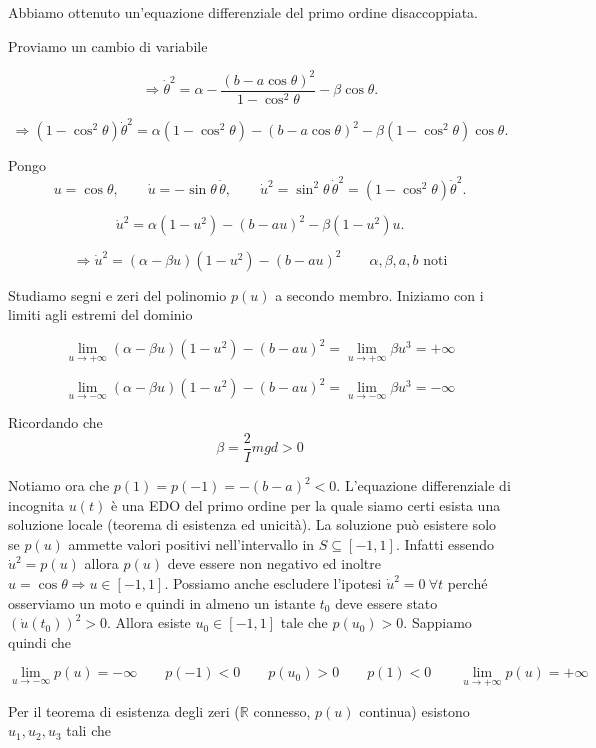 Abbiamo ottenuto un'equazione differenziale del primo ordine disaccoppiata.

Proviamo un cambio di variabile

\[
\Rightarrow
\dot{\theta}^2
=
\alpha
-
\frac{\left(b-a\cos\theta\right)^2}{1-\cos^2\theta}
-
\beta\cos\theta.
\]

\[
\Rightarrow
\left(1-\cos^2\theta\right)\dot{\theta}^2
=
\alpha\left(1-\cos^2\theta\right)
-
\left(b-a\cos\theta\right)^2
-
\beta\left(1-\cos^2\theta\right)\cos\theta.
\]

Pongo
\[
u=\cos\theta,
\qquad
\dot{u}=-\sin\theta\,\dot{\theta},
\qquad
\dot{u}^2
=
\sin^2\theta\,\dot{\theta}^2
=
\left(1-\cos^2\theta\right)\dot{\theta}^2.
\]

\[
\dot{u}^2
=
\alpha\left(1-u^2\right)
-
\left(b-au\right)^2
-
\beta\left(1-u^2\right)u.
\]

\[
\Rightarrow
\dot{u}^2
=
(\alpha-\beta u)(1-u^2)-(b-au)^2
\qquad
\alpha,\beta,a,b \text{ noti}
\]

Studiamo segni e zeri del polinomio \(p(u)\) a secondo membro. Iniziamo con i limiti agli estremi del dominio

\[
\lim_{u\to +\infty} (\alpha-\beta u)(1-u^2)-(b-au)^2
=
\lim_{u\to +\infty} \beta u^3
=
+\infty
\]

\[
\lim_{u\to -\infty} (\alpha-\beta u)(1-u^2)-(b-au)^2
=
\lim_{u\to -\infty} \beta u^3
=
-\infty
\]

Ricordando che
\[
\beta=\frac{2}{I}mgd>0
\]

Notiamo ora che \(p(1)=p(-1)=-(b-a)^2<0\). L'equazione differenziale di incognita \(u(t)\) è una EDO del primo ordine per la quale siamo certi esista una soluzione locale (teorema di esistenza ed unicità). La soluzione può esistere solo se \(p(u)\) ammette valori positivi nell'intervallo in \(S\subseteq[-1,1]\). Infatti essendo \(\dot{u}^2=p(u)\) allora \(p(u)\) deve essere non negativo ed inoltre \(u=\cos\theta \Rightarrow u\in[-1,1]\). Possiamo anche escludere l'ipotesi \(\dot{u}^2=0\ \forall t\) perché osserviamo un moto e quindi in almeno un istante \(t_0\) deve essere stato \((\dot{u}(t_0))^2>0\). Allora esiste \(u_0\in[-1,1]\) tale che \(p(u_0)>0\). Sappiamo quindi che

\[
\lim_{u\to -\infty} p(u)=-\infty
\qquad
p(-1)<0
\qquad
p(u_0)>0
\qquad
p(1)<0
\qquad
\lim_{u\to +\infty} p(u)=+\infty
\]

Per il teorema di esistenza degli zeri (\(\mathbb{R}\) connesso, \(p(u)\) continua) esistono \(u_1,u_2,u_3\) tali che


